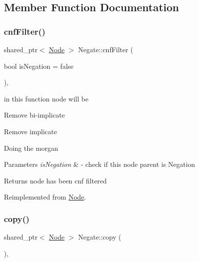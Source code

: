 \subsection{Member Function Documentation}
\mbox{\label{class_negate_a6aa803fea460f0a2a52399b778bfd268}} 
\subsubsection{\texorpdfstring{cnf\+Filter()}{cnfFilter()}}
{\footnotesize\ttfamily shared\+\_\+ptr$<$ \hyperlink{class_node}{Node} $>$ Negate\+::cnf\+Filter (\begin{DoxyParamCaption}\item[{bool}]{is\+Negation = {\ttfamily false} }\end{DoxyParamCaption})\hspace{0.3cm}{\ttfamily [override]}, {\ttfamily [virtual]}}



in this function node will be 


\begin{DoxyItemize}
\item Remove bi-\/implicate
\item Remove implicate
\item Doing the morgan 
\begin{DoxyParams}{Parameters}
{\em is\+Negation} & -\/ check if this node parent is Negation \\
\hline
\end{DoxyParams}
\begin{DoxyReturn}{Returns}
node has been cnf filtered 
\end{DoxyReturn}

\end{DoxyItemize}

Reimplemented from \hyperlink{class_node_ab5b01fd3c4efe0f2eaf7fc41653359b7}{Node}.

\mbox{\label{class_negate_a7cdd545814e819ef6b6ec735dda357aa}} 
\subsubsection{\texorpdfstring{copy()}{copy()}}
{\footnotesize\ttfamily shared\+\_\+ptr$<$ \hyperlink{class_node}{Node} $>$ Negate\+::copy (\begin{DoxyParamCaption}{ }\end{DoxyParamCaption})\hspace{0.3cm}{\ttfamily [override]}, {\ttfamily [virtual]}}



